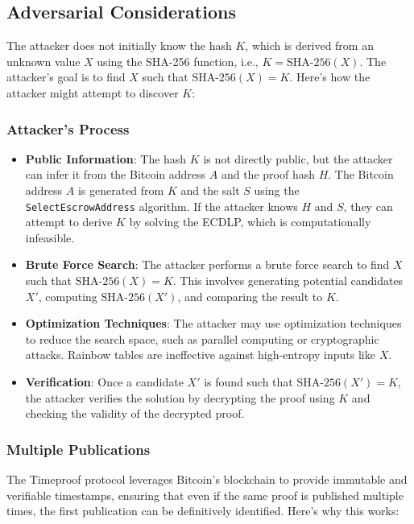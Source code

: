 \documentclass[12pt]{report}
\begin{document}
\subsection{Adversarial Considerations}

The attacker does not initially know the hash \( K \), which is derived from an unknown value \( X \) using the SHA-256 function, i.e., \( K = \text{SHA-256}(X) \). The attacker's goal is to find \( X \) such that \( \text{SHA-256}(X) = K \). Here's how the attacker might attempt to discover \( K \):

\subsubsection{Attacker's Process}
\begin{itemize}
    \item \textbf{Public Information}: The hash \( K \) is not directly public, but the attacker can infer it from the Bitcoin address \( A \) and the proof hash \( H \). The Bitcoin address \( A \) is generated from \( K \) and the salt \( S \) using the \texttt{SelectEscrowAddress} algorithm. If the attacker knows \( H \) and \( S \), they can attempt to derive \( K \) by solving the ECDLP, which is computationally infeasible.
    \item \textbf{Brute Force Search}: The attacker performs a brute force search to find \( X \) such that \( \text{SHA-256}(X) = K \). This involves generating potential candidates \( X' \), computing \( \text{SHA-256}(X') \), and comparing the result to \( K \).
    \item \textbf{Optimization Techniques}: The attacker may use optimization techniques to reduce the search space, such as parallel computing or cryptographic attacks. Rainbow tables are ineffective against high-entropy inputs like \( X \).
    \item \textbf{Verification}: Once a candidate \( X' \) is found such that \( \text{SHA-256}(X') = K \), the attacker verifies the solution by decrypting the proof using \( K \) and checking the validity of the decrypted proof.
\end{itemize}

\subsubsection{Multiple Publications}
The Timeproof protocol leverages Bitcoin's blockchain to provide immutable and verifiable timestamps, ensuring that even if the same proof is published multiple times, the first publication can be definitively identified. Here's why this works:
\end{document}
